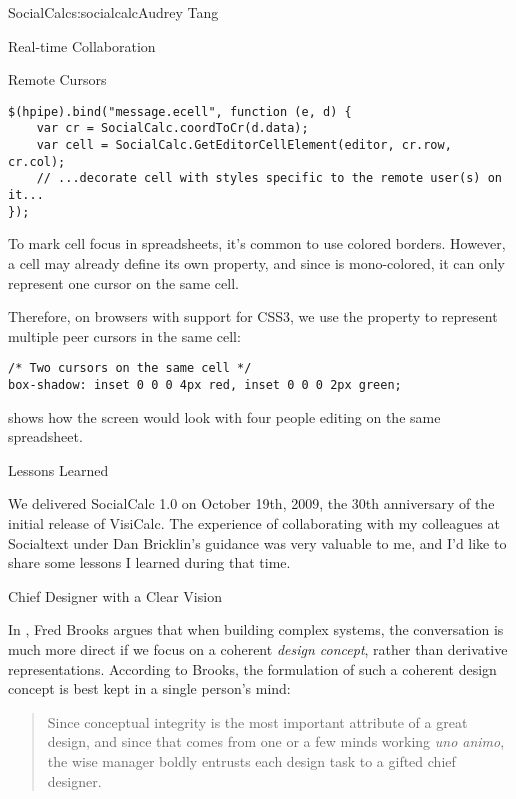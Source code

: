 \begin{aosachapter}{SocialCalc}{s:socialcalc}{Audrey Tang}
\begin{aosasect1}{Real-time Collaboration}
\begin{aosasect2}{Remote Cursors}
\begin{verbatim}
$(hpipe).bind("message.ecell", function (e, d) {
    var cr = SocialCalc.coordToCr(d.data);
    var cell = SocialCalc.GetEditorCellElement(editor, cr.row, cr.col);
    // ...decorate cell with styles specific to the remote user(s) on it...
});
\end{verbatim}

To mark cell focus in spreadsheets, it's common to use colored
borders.  However, a cell may already define its own 
property, and since  is mono-colored, it can only
represent one cursor on the same cell.

Therefore, on browsers with support for CSS3, we use the 
property to represent multiple peer cursors in the same cell:

\begin{verbatim}
/* Two cursors on the same cell */
box-shadow: inset 0 0 0 4px red, inset 0 0 0 2px green;
\end{verbatim}

 shows how the screen would look with four
people editing on the same spreadsheet.


\end{aosasect2}

\end{aosasect1}

\begin{aosasect1}{Lessons Learned}

We delivered SocialCalc 1.0 on October 19th, 2009, the 30th
anniversary of the initial release of VisiCalc.  The experience of
collaborating with my colleagues at Socialtext under Dan Bricklin's
guidance was very valuable to me, and I'd like to share some lessons
I learned during that time.

\begin{aosasect2}{Chief Designer with a Clear Vision}

In \cite{bib:brooks:design}, Fred Brooks argues that when building
complex systems, the conversation is much more direct if we focus on a
coherent \emph{design concept}, rather than derivative
representations. According to Brooks, the formulation of such a
coherent design concept is best kept in a single person's mind:

\begin{quotation}

  \noindent
  Since conceptual integrity is the most important attribute of a
  great design, and since that comes from one or a few minds working
  \emph{uno animo}, the wise manager boldly entrusts each design task to a
  gifted chief designer.


\end{quotation}
\end{aosasect2}
\end{aosasect1}
\end{aosachapter}
